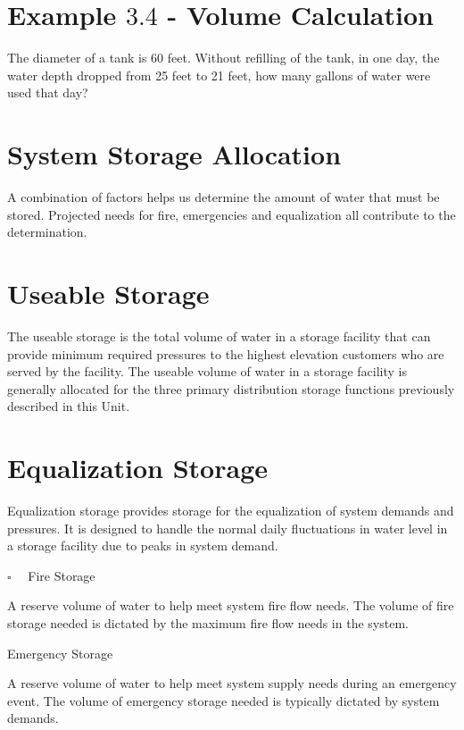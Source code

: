 \documentclass[10pt]{article}
\begin{document}
\section{Example $3.4$ - Volume Calculation}
The diameter of a tank is 60 feet. Without refilling of the tank, in one day, the water depth dropped from 25 feet to 21 feet, how many gallons of water were used that day?

\section{System Storage Allocation}
A combination of factors helps us determine the amount of water that must be stored. Projected needs for fire, emergencies and equalization all contribute to the determination.

\section{Useable Storage}
The useable storage is the total volume of water in a storage facility that can provide minimum required pressures to the highest elevation customers who are served by the facility. The useable volume of water in a storage facility is generally allocated for the three primary distribution storage functions previously described in this Unit.

\section{Equalization Storage}
Equalization storage provides storage for the equalization of system demands and pressures. It is designed to handle the normal daily fluctuations in water level in a storage facility due to peaks in system demand.

$\square \quad$ Fire Storage

A reserve volume of water to help meet system fire flow needs. The volume of fire storage needed is dictated by the maximum fire flow needs in the system.

Emergency Storage

A reserve volume of water to help meet system supply needs during an emergency event. The volume of emergency storage needed is typically dictated by system demands.
\end{document}
